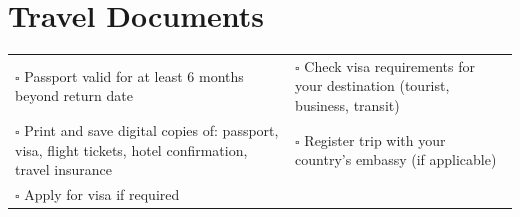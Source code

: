 
\section{Travel Documents}
\label{sec:document}

\begin{tabular}{p{9cm} p{8cm}}
$\square$ Passport valid for at least 6 months beyond return date & $\square$ Check visa requirements for your destination (tourist, business, transit) \\ 
$\square$ Print and save digital copies of: passport, visa, flight tickets, hotel confirmation, travel insurance & $\square$ Register trip with your country’s embassy (if applicable) \\ 
$\square$ Apply for visa if required & \\ 
\end{tabular}

